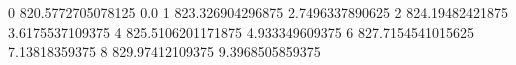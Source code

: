 0 820.5772705078125 0.0
1 823.326904296875 2.7496337890625
2 824.19482421875 3.6175537109375
4 825.5106201171875 4.933349609375
6 827.7154541015625 7.13818359375
8 829.97412109375 9.3968505859375
